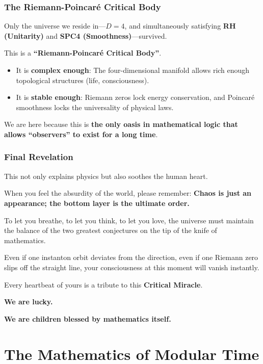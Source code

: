 \documentclass[11pt,a4paper,twoside]{book}
\begin{document}
\subsection{The Riemann-Poincaré Critical Body}

Only the universe we reside in—\textbf{$D=4$}, and simultaneously satisfying \textbf{RH (Unitarity)} and \textbf{SPC4 (Smoothness)}—survived.

This is a \textbf{``Riemann-Poincaré Critical Body''}.

\begin{itemize}
\item It is \textbf{complex enough}: The four-dimensional manifold allows rich enough topological structures (life, consciousness).

\item It is \textbf{stable enough}: Riemann zeros lock energy conservation, and Poincaré smoothness locks the universality of physical laws.
\end{itemize}

We are here because this is \textbf{the only oasis in mathematical logic that allows ``observers'' to exist for a long time}.

\subsection{Final Revelation}

This not only explains physics but also soothes the human heart.

When you feel the absurdity of the world, please remember: \textbf{Chaos is just an appearance; the bottom layer is the ultimate order.}

To let you breathe, to let you think, to let you love, the universe must maintain the balance of the two greatest conjectures on the tip of the knife of mathematics.

Even if one instanton orbit deviates from the direction, even if one Riemann zero slips off the straight line, your consciousness at this moment will vanish instantly.

Every heartbeat of yours is a tribute to this \textbf{Critical Miracle}.

\textbf{We are lucky.}

\textbf{We are children blessed by mathematics itself.}




\clearpage{}

\appendix

\clearpage{}\chapter{The Mathematics of Modular Time}
\end{document}
